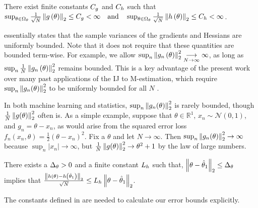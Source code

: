 %
\begin{assumption} \label{assu:paper_bounded}
There exist finite constants $C_{g}$ and $C_{h}$ such that
$\sup_{\theta\in\Omega_{\theta}}
    \frac{1}{\sqrt{N}} \left\Vert g\left(\theta\right)\right\Vert_{2}\le C_{g}<\infty
\quad\textrm{and}\quad
\sup_{\theta\in\Omega_{\theta}}
    \frac{1}{\sqrt{N}} \left\Vert h\left(\theta\right)\right\Vert_{2} \le C_{h}<\infty$.
\end{assumption}
%
 essentially states that the sample variances of the
gradients and Hessians are uniformly bounded. Note that it does not require that
these quantities are bounded term-wise. For example, we allow
$\sup_{n}\left\Vert g_{n}\left(\theta\right)\right\Vert_2^2
\underset{N\rightarrow\infty}{\longrightarrow}\infty$, as long as
$\sup_{n}\frac{1}{N}\left\Vert g_{n}\left(\theta\right)\right\Vert^{2}_2$ remains bounded. This
is a key advantage of the present work over many past applications of the IJ to
M-estimation, which require $\sup_n \left\Vert g_n(\theta)\right\Vert_2^2$ to be uniformly
bounded for all $N$ \citep{shao:2012:jackknife, BeiramiRST17}.

In both machine learning and
statistics, $\sup_n\left\Vert g_n(\theta)\right\Vert_2^2$ is rarely bounded, though
$\frac{1}{N}\left\Vert g(\theta)\right\Vert_2^2$ often is.  As a simple example, suppose
that $\theta \in \mathbb{R}^1$, $x_n \sim \mathcal{N}(0, 1)$, and
$g_n = \theta - x_n$, as would arise from the squared error loss
$f_n\left(x_n, \theta\right) = \frac{1}{2}\left(\theta - x_n\right)^2$.
Fix a $\theta$ and let $N \rightarrow \infty$.  Then
$\sup_n\left\Vert g_n(\theta)\right\Vert_2^2 \rightarrow \infty$ because
$\sup_n |x_n| \rightarrow \infty$, but
$\frac{1}{N}\left\Vert g(\theta)\right\Vert_2^2 \rightarrow \theta^2 + 1$ by the law of
large numbers.
%
\begin{assumption} \label{assu:paper_lipschitz}
There exists a $\Delta_{\theta}>0$ and a finite constant $L_{h}$ such that,
$\left\Vert \theta-\hat{\theta}_{1}\right\Vert_{2} \le \Delta_{\theta}$ implies that
$\frac{\left\Vert h\left(\theta\right)-h\left(\hat{\theta}_{1}\right)\right\Vert_{2}}
    {\sqrt{N}}\le L_{h}\left\Vert \theta-\hat{\theta}_{1}\right\Vert_{2}$.
\end{assumption}
%
The constants defined in  are needed to calculate
our error bounds explicitly.

